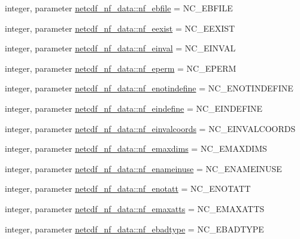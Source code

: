 \begin{DoxyCompactItemize}
\item 
integer, parameter \hyperlink{namespacenetcdf__nf__data_a00bf57710d47fba9afbfe51ce91e36a1}{netcdf\+\_\+nf\+\_\+data\+::nf\+\_\+ebfile} = N\+C\+\_\+\+E\+B\+F\+I\+LE
\item 
integer, parameter \hyperlink{namespacenetcdf__nf__data_adf41aab468851d0834f57f4e3005905d}{netcdf\+\_\+nf\+\_\+data\+::nf\+\_\+eexist} = N\+C\+\_\+\+E\+E\+X\+I\+ST
\item 
integer, parameter \hyperlink{namespacenetcdf__nf__data_a8da93d02620d2bcb4100bfd8bf86c552}{netcdf\+\_\+nf\+\_\+data\+::nf\+\_\+einval} = N\+C\+\_\+\+E\+I\+N\+V\+AL
\item 
integer, parameter \hyperlink{namespacenetcdf__nf__data_ab7837c92cf78856dde1888b059c4272c}{netcdf\+\_\+nf\+\_\+data\+::nf\+\_\+eperm} = N\+C\+\_\+\+E\+P\+E\+RM
\item 
integer, parameter \hyperlink{namespacenetcdf__nf__data_af90d8851a7c3d8fbd55997ef68d09ec9}{netcdf\+\_\+nf\+\_\+data\+::nf\+\_\+enotindefine} = N\+C\+\_\+\+E\+N\+O\+T\+I\+N\+D\+E\+F\+I\+NE
\item 
integer, parameter \hyperlink{namespacenetcdf__nf__data_a605e98de7b8cf91afd5986794875dc91}{netcdf\+\_\+nf\+\_\+data\+::nf\+\_\+eindefine} = N\+C\+\_\+\+E\+I\+N\+D\+E\+F\+I\+NE
\item 
integer, parameter \hyperlink{namespacenetcdf__nf__data_a55c688d94423d848be5bbefb3307e163}{netcdf\+\_\+nf\+\_\+data\+::nf\+\_\+einvalcoords} = N\+C\+\_\+\+E\+I\+N\+V\+A\+L\+C\+O\+O\+R\+DS
\item 
integer, parameter \hyperlink{namespacenetcdf__nf__data_a8af604876ca59d4505c87ea8d9968eb2}{netcdf\+\_\+nf\+\_\+data\+::nf\+\_\+emaxdims} = N\+C\+\_\+\+E\+M\+A\+X\+D\+I\+MS
\item 
integer, parameter \hyperlink{namespacenetcdf__nf__data_a4a03e9bf1ece300a2bcee59ee3ad0fbf}{netcdf\+\_\+nf\+\_\+data\+::nf\+\_\+enameinuse} = N\+C\+\_\+\+E\+N\+A\+M\+E\+I\+N\+U\+SE
\item 
integer, parameter \hyperlink{namespacenetcdf__nf__data_af496013ec552a295c4fa4e014891a966}{netcdf\+\_\+nf\+\_\+data\+::nf\+\_\+enotatt} = N\+C\+\_\+\+E\+N\+O\+T\+A\+TT
\item 
integer, parameter \hyperlink{namespacenetcdf__nf__data_ab9be355ae222094c53c1bbff6e648db0}{netcdf\+\_\+nf\+\_\+data\+::nf\+\_\+emaxatts} = N\+C\+\_\+\+E\+M\+A\+X\+A\+T\+TS
\item 
integer, parameter \hyperlink{namespacenetcdf__nf__data_a614f04ea82eeb283ca59cf2b0143bc26}{netcdf\+\_\+nf\+\_\+data\+::nf\+\_\+ebadtype} = N\+C\+\_\+\+E\+B\+A\+D\+T\+Y\+PE

\end{DoxyCompactItemize}
